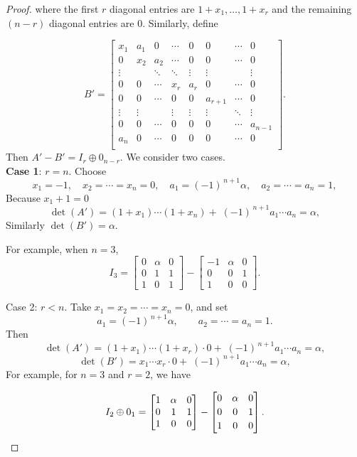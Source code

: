 \documentclass[10pt,a4paper]{amsart}
\begin{document}
\begin{proof}
where the first $r$ diagonal entries are \(1+x_1,\dots,1+x_r\) and the remaining $(n-r)$ diagonal entries are 0. Similarly, define  

\[
B'=
\begin{bmatrix}
x_1 & a_1 & 0 & \cdots & 0 & 0 & \cdots & 0\\
0 & x_2 & a_2 & \cdots & 0 & 0 & \cdots & 0\\
\vdots & & \ddots & \ddots & \vdots & \vdots & & \vdots\\
0 & 0 & \cdots & x_r & a_r & 0 & \cdots & 0\\
0 & 0 & \cdots & 0 & 0 & a_{r+1} & \cdots & 0\\
\vdots & \vdots & & \vdots & \vdots & \vdots & \ddots & \vdots\\
0 & 0 & \cdots & 0 & 0 & 0 & \cdots  & a_{n-1} \\
a_n & 0 & \cdots & 0 & 0 & 0 & \cdots  & 0 \\
\end{bmatrix}.
\]
Then $A'-B' =I_r\oplus 0_{n-r}. $ We consider two cases. \\ 

\textbf{Case 1}: \(r=n\). Choose
\[
x_1=-1,\quad x_2=\cdots=x_n=0,\quad a_1=(-1)^{\,n+1}\alpha,\quad a_2=\cdots=a_n=1,
\]
Because $x_1+1=0$
\[
\det(A')= (1+x_1) \cdots(1+x_n)+\;(-1)^{\,n+1}a_1\cdots a_n=\alpha,
\]
Similarly $\det(B')=\alpha$. 

For example, when \(n=3\),
\[
I_3=\begin{bmatrix}0&\alpha&0\\[2pt]0&1&1\\[2pt]1&0&1\end{bmatrix}
-\begin{bmatrix}-1&\alpha&0\\[2pt]0&0&1\\[2pt]1&0&0\end{bmatrix}.
\]

Case 2: \(r<n\). Take \(x_{1}=x_2=\cdots=x_n=0\), and set
\[
a_1=(-1)^{\,n+1}\alpha,\qquad a_2=\cdots=a_n=1.
\]
Then 
\[
\det(A')=(1+x_1)\cdots(1+x_r)\cdot 0+\;(-1)^{\,n+1}a_1\cdots a_n=\alpha,
\]
\[
\det(B')=x_1\cdots x_r\cdot 0+\;(-1)^{\,n+1}a_1\cdots a_n=\alpha,
\]
For example, for $n=3$ and $r=2$, we have

\[
I_2 \oplus 0_1=\begin{bmatrix}1& \alpha& 0\\ 0&1&1\\ 1&0&0 \end{bmatrix}
-\begin{bmatrix}0&\alpha&0\\[2pt]0&0&1\\[2pt]1&0&0\end{bmatrix}.
\qedhere
\]
\end{proof}
\end{document}
